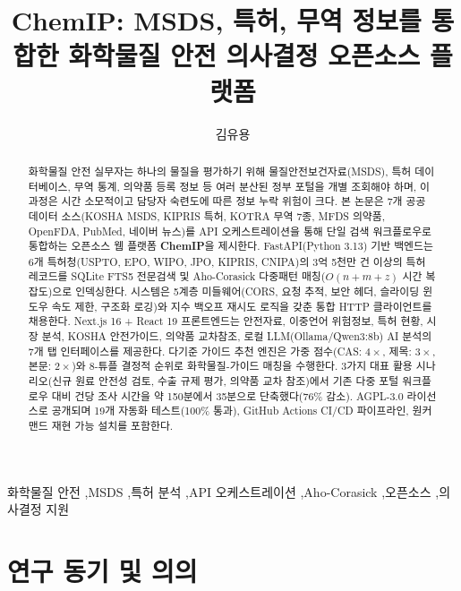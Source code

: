 \documentclass[preprint,12pt]{elsarticle}
\begin{document}
\begin{frontmatter}

\title{ChemIP: MSDS, 특허, 무역 정보를 통합한 화학물질 안전 의사결정 오픈소스 플랫폼}

\author[inst1]{김유용}


\begin{abstract}
화학물질 안전 실무자는 하나의 물질을 평가하기 위해 물질안전보건자료(MSDS), 특허 데이터베이스, 무역 통계, 의약품 등록 정보 등 여러 분산된 정부 포털을 개별 조회해야 하며, 이 과정은 시간 소모적이고 담당자 숙련도에 따른 정보 누락 위험이 크다.
본 논문은 7개 공공 데이터 소스(KOSHA MSDS, KIPRIS 특허, KOTRA 무역 7종, MFDS 의약품, OpenFDA, PubMed, 네이버 뉴스)를 API 오케스트레이션을 통해 단일 검색 워크플로우로 통합하는 오픈소스 웹 플랫폼 \textbf{ChemIP}을 제시한다.
FastAPI(Python 3.13) 기반 백엔드는 6개 특허청(USPTO, EPO, WIPO, JPO, KIPRIS, CNIPA)의 3억 5천만 건 이상의 특허 레코드를 SQLite FTS5 전문검색 및 Aho-Corasick 다중패턴 매칭($O(n+m+z)$ 시간 복잡도)으로 인덱싱한다.
시스템은 5계층 미들웨어(CORS, 요청 추적, 보안 헤더, 슬라이딩 윈도우 속도 제한, 구조화 로깅)와 지수 백오프 재시도 로직을 갖춘 통합 HTTP 클라이언트를 채용한다.
Next.js 16 + React 19 프론트엔드는 안전자료, 이중언어 위험정보, 특허 현황, 시장 분석, KOSHA 안전가이드, 의약품 교차참조, 로컬 LLM(Ollama/Qwen3:8b) AI 분석의 7개 탭 인터페이스를 제공한다.
다기준 가이드 추천 엔진은 가중 점수(CAS: $4\times$, 제목: $3\times$, 본문: $2\times$)와 8-튜플 결정적 순위로 화학물질-가이드 매칭을 수행한다.
3가지 대표 활용 시나리오(신규 원료 안전성 검토, 수출 규제 평가, 의약품 교차 참조)에서 기존 다중 포털 워크플로우 대비 건당 조사 시간을 약 150분에서 35분으로 단축했다(76\% 감소).
AGPL-3.0 라이선스로 공개되며 19개 자동화 테스트(100\% 통과), GitHub Actions CI/CD 파이프라인, 원커맨드 재현 가능 설치를 포함한다.
\end{abstract}

\begin{keyword}
화학물질 안전 \sep MSDS \sep 특허 분석 \sep API 오케스트레이션 \sep Aho-Corasick \sep 오픈소스 \sep 의사결정 지원
\end{keyword}

\end{frontmatter}

\section{연구 동기 및 의의}
\label{sec:motivation}
\end{document}
